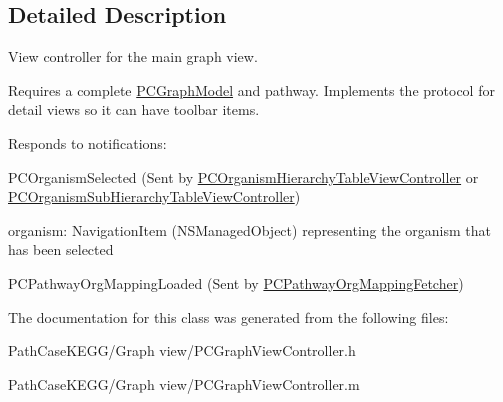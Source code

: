 \subsection{Detailed Description}
View controller for the main graph view. 

Requires a complete \hyperlink{interface_p_c_graph_model}{PCGraphModel} and pathway. Implements the protocol for detail views so it can have toolbar items.

Responds to notifications:


\begin{DoxyItemize}
\item PCOrganismSelected (Sent by \hyperlink{interface_p_c_organism_hierarchy_table_view_controller}{PCOrganismHierarchyTableViewController} or \hyperlink{interface_p_c_organism_sub_hierarchy_table_view_controller}{PCOrganismSubHierarchyTableViewController})
\begin{DoxyItemize}
\item organism: NavigationItem (NSManagedObject) representing the organism that has been selected
\end{DoxyItemize}
\end{DoxyItemize}


\begin{DoxyItemize}
\item PCPathwayOrgMappingLoaded (Sent by \hyperlink{interface_p_c_pathway_org_mapping_fetcher}{PCPathwayOrgMappingFetcher}) 
\end{DoxyItemize}

The documentation for this class was generated from the following files:\begin{DoxyCompactItemize}
\item 
PathCaseKEGG/Graph view/PCGraphViewController.h\item 
PathCaseKEGG/Graph view/PCGraphViewController.m\end{DoxyCompactItemize}

